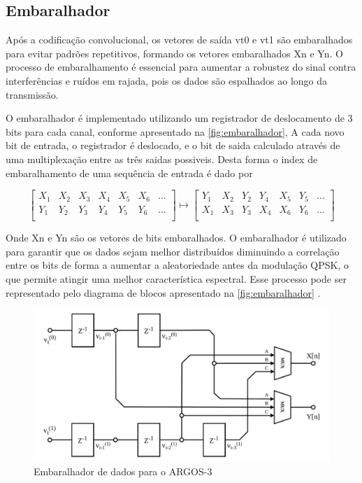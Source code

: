\subsection{Embaralhador}

Após a codificação convolucional, os vetores de saída \gls{vt0} e \gls{vt1} são embaralhados para evitar padrões repetitivos, formando os vetores embaralhados \gls{Xn} e \gls{Yn}. O processo de embaralhamento é essencial para aumentar a robustez do sinal contra interferências e ruídos em rajada, pois os dados são espalhados ao longo da transmissão.

O embaralhador é implementado utilizando um registrador de deslocamento de 3 bits para cada canal, conforme apresentado na \autoref{fig:embaralhador}, A cada novo bit de entrada, o registrador é deslocado, e o bit de saida calculado através de uma multiplexação entre as três saidas possiveis. Desta forma o index de embaralhamento de uma sequência de entrada é dado por

\vspace{-1em}
\begin{equation}
    \begin{bmatrix}
        X_1 & X_2 & X_3 & X_4 & X_5 & X_6 & \dots \\
        Y_1 & Y_2 & Y_3 & Y_4 & Y_5 & Y_6 & \dots \\
    \end{bmatrix}
    \mapsto 
    \begin{bmatrix}
        Y_1 & X_2 & Y_2 & Y_4 & X_5 & Y_5 & \dots \\
        X_1 & X_3 & Y_3 & X_4 & X_6 & Y_6 & \dots \\ 
    \end{bmatrix}
\end{equation}

\noindent Onde \gls{Xn} e \gls{Yn} são os vetores de bits embaralhados. O embaralhador é utilizado para garantir que os dados sejam melhor distribuídos diminuindo a correlação entre os bits de forma a aumentar a aleatoriedade antes da modulação \gls{QPSK}, o que permite atingir uma melhor característica espectral. Esse processo pode ser representado pelo diagrama de blocos apresentado na \autoref{fig:embaralhador} \cite{cnes_services_and_message_formats_ed2_rev2_2006, rodrigues_demodulador_2018}.

\begin{figure}[H]
	\centering
	\caption{Embaralhador de dados para o ARGOS-3}\label{fig:embaralhador}
	\includegraphics[width=\linewidth]{assets/cap2/scrambler.pdf}
\end{figure}

